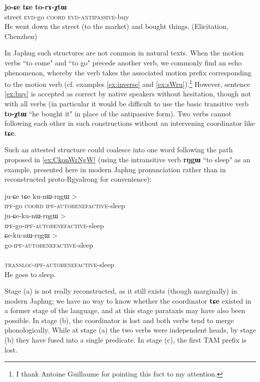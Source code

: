 \documentclass[oldfontcommands,twoside,a4paper,12pt]{article}
\newcommand{\ipa}[1]{{\phon\textbf{#1}}}
\newcommand{\evd}{\textsc{evd}}
\begin{document}
\begin{exe}
\ex  \label{ex:buy}
\gll   \ipa{kɤntɕhaʁ} \ipa{jo-ɕe} \ipa{tɕe} \ipa{to-rɤ-χtɯ} \\
  street \evd{}-go  \textsc{coord} \evd{}-\textsc{antipassive}-buy\\
\glt He went down the street (to the market) and  bought things. (Elicitation, Chenzhen)
\end{exe}

In Japhug such structures are not common in natural texts. When the motion verbs ``to come" and ``to go" precede  another verb, we commonly find an echo phenomenon, whereby the verb takes the associated motion prefix corresponding to the motion verb  (cf. examples \ref{ex:inverse} and \ref{ex:sWru}).\footnote{I thank Antoine Guillaume for pointing this fact to my attention.} However, sentence \ref{ex:buy} is accepted as correct by native speakers without hesitation, though not with all verbs (in particular it would be difficult to use the basic transitive verb \ipa{to-χtɯ} ``he bought it" in place of the antipassive form). Two verbs cannot following each other in such constructions without an intervening coordinator like \ipa{tɕe}.

Such an attested structure could coalesce into one word following the path proposed in \ref{ex:CkonWrNgW} (using the intransitive verb \ipa{rŋgɯ} ``to sleep" as an example, presented here in  modern Japhug pronunciation rather than in reconstructed proto-Rgyalrong for convenience):

\begin{exe}
\ex   \label{ex:CkonWrNgW}
\begin{xlist}
\gll *ju-ɕe tɕe ku-nɯ-rŋgɯ >  \\
\textsc{ipf}-go \textsc{coord} \textsc{ipf}-\textsc{autobenefactive}-sleep   \\
\gll  *ju-ɕe-ku-nɯ-rŋgɯ > \\
 \textsc{ipf}-go-\textsc{ipf}-\textsc{autobenefactive}-sleep    \\
\gll  *ɕe-ku-nɯ-rŋgɯ > \\
 go-\textsc{ipf}-\textsc{autobenefactive}-sleep   \\
\gll   \ipa{ɕ-ku-nɯ-rŋgɯ} \\
  \textsc{transloc}-\textsc{ipf}-\textsc{autobenefactive}-sleep \\
\glt He goes to sleep.
\end{xlist}
\end{exe}
Stage (a) is not really reconstructed, as it still exists (though marginally) in modern Japhug; we have no way to know whether the coordinator \ipa{tɕe} existed in a former stage of the language, and at this stage parataxis may have also been possible. In stage (b), the coordinator is lost and both verbs tend to merge phonologically. While at stage (a) the two verbs were  independent heads, by stage (b) they have fused into a single predicate. In stage (c), the first TAM prefix is lost. 
\end{document}
